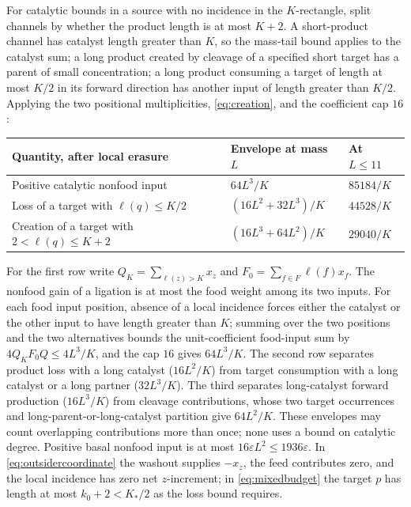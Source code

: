 \documentclass[11pt,letterpaper]{article}
\theoremstyle{plain}
\theoremstyle{definition}
\theoremstyle{remark}
\numberwithin{equation}{section}
\newcommand{\eps}{\varepsilon}
\begin{document}
For catalytic bounds in a source with no incidence in the $K$-rectangle, split channels by whether the product length is at most $K+2$. A short-product channel has catalyst length greater than $K$, so the mass-tail bound applies to the catalyst sum; a long product created by cleavage of a specified short target has a parent of small concentration; a long product consuming a target of length at most $K/2$ in its forward direction has another input of length greater than $K/2$. Applying the two positional multiplicities, \eqref{eq:creation}, and the coefficient cap $16$:
\begin{center}\small
\begin{tabular}{@{}lll@{}}
\toprule
Quantity, after local erasure & Envelope at mass $L$ & At $L\le11$\\
\midrule
Positive catalytic nonfood input & $64L^3/K$ & $85184/K$\\
Loss of a target with $\ell(q)\le K/2$ & $(16L^2+32L^3)/K$ & $44528/K$\\
Creation of a target with $2<\ell(q)\le K+2$ & $(16L^3+64L^2)/K$ & $29040/K$\\
\bottomrule
\end{tabular}
\end{center}
For the first row write $Q_K=\sum_{\ell(z)>K}x_z$ and $F_0=\sum_{f\in F}\ell(f)x_f$. The nonfood gain of a ligation is at most the food weight among its two inputs. For each food input position, absence of a local incidence forces either the catalyst or the other input to have length greater than $K$; summing over the two positions and the two alternatives bounds the unit-coefficient food-input sum by $4Q_KF_0Q\le4L^3/K$, and the cap $16$ gives $64L^3/K$. The second row separates product loss with a long catalyst ($16L^2/K$) from target consumption with a long catalyst or a long partner ($32L^3/K$). The third separates long-catalyst forward production ($16L^3/K$) from cleavage contributions, whose two target occurrences and long-parent-or-long-catalyst partition give $64L^2/K$. These envelopes may count overlapping contributions more than once; none uses a bound on catalytic degree. Positive basal nonfood input is at most $16\eps L^2\le1936\eps$. In \eqref{eq:outsidercoordinate} the washout supplies $-x_z$, the feed contributes zero, and the local incidence has zero net $z$-increment; in \eqref{eq:mixedbudget} the target $p$ has length at most $k_0+2<K_*/2$ as the loss bound requires.
\end{document}
